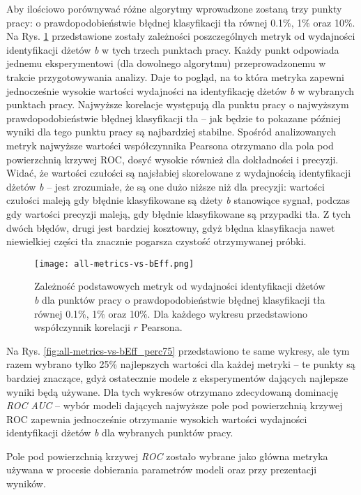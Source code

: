 Aby ilościowo porównywać różne algorytmy wprowadzone zostaną trzy punkty pracy: o prawdopodobieństwie błędnej klasyfikacji tła równej 0.1\%, 1\% oraz 10\%.
Na Rys. \ref{fig:all-metrics-vs-bEff} przedstawione zostały zależności poszczególnych metryk od wydajności identyfikacji dżetów \textit{b} w tych trzech punktach pracy. Każdy punkt odpowiada jednemu eksperymentowi (dla dowolnego algorytmu) przeprowadzonemu w trakcie przygotowywania analizy. Daje to pogląd, na to która metryka zapewni jednocześnie wysokie wartości wydajności na identyfikację dżetów \textit{b} w wybranych punktach pracy. 
Najwyższe korelacje występują dla punktu pracy o najwyższym prawdopodobieństwie błędnej klasyfikacji tła -- jak będzie to pokazane później wyniki dla tego punktu pracy są najbardziej stabilne. Spośród analizowanych metryk najwyższe wartości współczynnika Pearsona otrzymano dla pola pod powierzchnią krzywej ROC, dosyć wysokie również dla dokładności i precyzji. Widać, że wartości czułości są najsłabiej skorelowane z wydajnością identyfikacji dżetów \textit{b} -- jest zrozumiałe, że są one dużo niższe niż dla precyzji: wartości czułości maleją gdy błędnie klasyfikowane są dżety \textit{b} stanowiące sygnał, podczas gdy wartości precyzji maleją, gdy błędnie klasyfikowane są przypadki tła. 
Z tych dwóch błędów, drugi jest bardziej kosztowny, gdyż błędna klasyfikacja nawet niewielkiej części tła znacznie pogarsza czystość otrzymywanej próbki.


\begin{figure}[ht]
	\centering
	\texttt{[image: all-metrics-vs-bEff.png]}
	\caption{Zależność podstawowych metryk od wydajności identyfikacji dżetów \textit{b} dla punktów pracy o prawdopodobieństwie błędnej klasyfikacji tła równej 0.1\%, 1\% oraz 10\%. Dla każdego wykresu przedstawiono współczynnik korelacji $r$ Pearsona.}
	\label{fig:all-metrics-vs-bEff}
\end{figure}

Na Rys. \ref{fig:all-metrics-vs-bEff_perc75} przedstawiono te same wykresy, ale tym razem wybrano tylko 25\% najlepszych wartości dla każdej metryki -- te punkty są bardziej znaczące, gdyż ostatecznie modele z eksperymentów dających najlepsze wyniki będą używane.
Dla tych wykresów otrzymano zdecydowaną dominację \textit{ROC AUC} -- wybór modeli dających najwyższe pole pod powierzchnią krzywej ROC zapewnia jednocześnie otrzymanie wysokich wartości wydajności identyfikacji dżetów \textit{b} dla wybranych punktów pracy. 

Pole pod powierzchnią krzywej \textit{ROC} zostało wybrane jako główna metryka używana w procesie dobierania parametrów modeli oraz przy prezentacji wyników.

